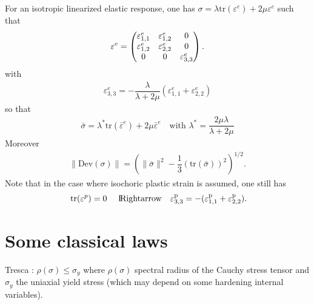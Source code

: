 \documentclass[a4paper,11pt,english]{sphinxmanual}
\begin{document}
For an isotropic linearized elastic response, one has \(\sigma = \lambda \mbox{tr}(\varepsilon^e) + 2\mu\varepsilon^e\) such that
\begin{equation*}
\begin{split}\varepsilon^e = \left(\hspace{-0.5em}\begin{array}{ccc} \varepsilon^e_{1,1} & \varepsilon^e_{1,2} & 0 \\ \varepsilon^e_{1,2} & \varepsilon^e_{2,2} & 0 \\ 0 & 0 & \varepsilon^e_{3,3} \end{array}\hspace{-0.5em}\right).\end{split}
\end{equation*}
with
\begin{equation*}
\begin{split}\varepsilon^e_{3,3} = -\dfrac{\lambda}{\lambda+2\mu}(\varepsilon^e_{1,1} + \varepsilon^e_{2,2})\end{split}
\end{equation*}
so that
\begin{equation}\label{equation:userdoc/model_plasticity_small_strain:plane_stress_iso}
\begin{split}\bar{\sigma} = \lambda^* \mbox{tr}(\bar{\varepsilon}^e) + 2\mu\bar{\varepsilon}^e ~~~\mbox{ with } \lambda^* = \dfrac{2\mu\lambda}{\lambda+2\mu}\end{split}
\end{equation}
Moreover
\begin{equation}\label{equation:userdoc/model_plasticity_small_strain:plane_stress_dev}
\begin{split}\|\mbox{Dev}(\sigma)\| = \left(\|\bar{\sigma}\|^2 - \dfrac{1}{3}(\mbox{tr}(\bar{\sigma}))^2\right)^{1/2}.\end{split}
\end{equation}
Note that in the case where isochoric plastic strain is assumed, one still has
\begin{equation*}
\begin{split}\mbox{ tr}(\varepsilon^p) = 0 ~~~~ \rm I\hspace{-0.15em}Rightarrow  ~~~ \varepsilon^p_{3,3} = - (\varepsilon^p_{1,1} + \varepsilon^p_{2,2}).\end{split}
\end{equation*}

\section{Some classical laws}
\label{\detokenize{userdoc/model_plasticity_small_strain:some-classical-laws}}
Tresca : \(\rho(\sigma) \le \sigma_y\) where \(\rho(\sigma)\) spectral radius of the Cauchy stress tensor and \(\sigma_y\) the uniaxial yield stress (which may depend on some hardening internal variables).
\end{document}
